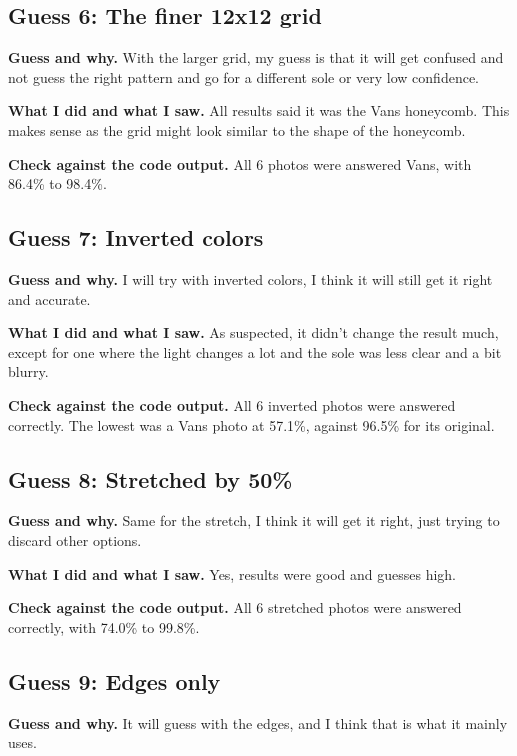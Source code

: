\documentclass[11pt]{article}
\begin{document}
\subsection*{Guess 6: The finer 12x12 grid}
\textbf{Guess and why.} With the larger grid, my guess is that it will get confused and not guess the right pattern and go for a different sole or very low confidence.

\textbf{What I did and what I saw.} All results said it was the Vans honeycomb. This makes sense as the grid might look similar to the shape of the honeycomb.


\textbf{Check against the code output.} All 6 photos were answered Vans, with 86.4\% to 98.4\%.

\subsection*{Guess 7: Inverted colors}
\textbf{Guess and why.} I will try with inverted colors, I think it will still get it right and accurate.

\textbf{What I did and what I saw.} As suspected, it didn't change the result much, except for one where the light changes a lot and the sole was less clear and a bit blurry.


\textbf{Check against the code output.} All 6 inverted photos were answered correctly. The lowest was a Vans photo at 57.1\%, against 96.5\% for its original.

\subsection*{Guess 8: Stretched by 50\%}
\textbf{Guess and why.} Same for the stretch, I think it will get it right, just trying to discard other options.

\textbf{What I did and what I saw.} Yes, results were good and guesses high.


\textbf{Check against the code output.} All 6 stretched photos were answered correctly, with 74.0\% to 99.8\%.

\subsection*{Guess 9: Edges only}
\textbf{Guess and why.} It will guess with the edges, and I think that is what it mainly uses.
\end{document}
